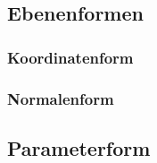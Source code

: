 \subsection{Ebenenformen}
\subsubsection{Koordinatenform}
\subsubsection{Normalenform}
\subsection{Parameterform}
